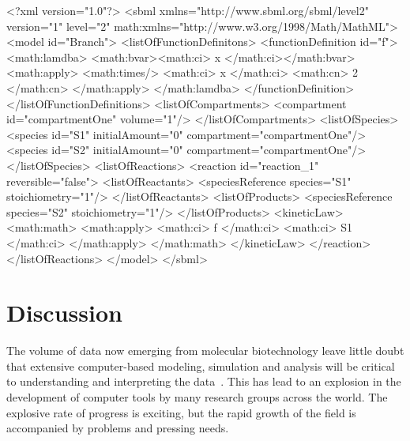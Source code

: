 \documentclass[10pt]{cekarticle}
\begin{document}
\begin{example}
<?xml version="1.0"?>
<sbml xmlns="http://www.sbml.org/sbml/level2" version="1" level="2"
      math:xmlns="http://www.w3.org/1998/Math/MathML">
    <model id="Branch">
        <listOfFunctionDefinitons>
            <functionDefinition id="f">
                <math:lamdba>
                    <math:bvar><math:ci> x </math:ci></math:bvar>
                    <math:apply>
                        <math:times/>
                        <math:ci> x </math:ci>
                        <math:cn> 2 </math:cn>
                    </math:apply>
                </math:lamdba>
            </functionDefinition>
        </listOfFunctionDefinitions>
        <listOfCompartments>
            <compartment id="compartmentOne" volume="1"/>
        </listOfCompartments>
        <listOfSpecies>
            <species id="S1" initialAmount="0" compartment="compartmentOne"/>
            <species id="S2" initialAmount="0" compartment="compartmentOne"/>
        </listOfSpecies>
        <listOfReactions>
            <reaction id="reaction_1" reversible="false">
                <listOfReactants>
                    <speciesReference species="S1" stoichiometry="1"/>
                </listOfReactants>
                <listOfProducts>
                    <speciesReference species="S2" stoichiometry="1"/>
                </listOfProducts>
                <kineticLaw>
                    <math:math>
                        <math:apply>
                            <math:ci> f </math:ci>
                            <math:ci> S1 </math:ci>
                         </math:apply>
                    </math:math>
                </kineticLaw>
            </reaction>
        </listOfReactions>
    </model>
</sbml>
\end{example}

\section{Discussion}
\label{sec:discussion}

The volume of data now emerging from molecular biotechnology
leave little doubt that extensive computer-based modeling, simulation and
analysis will be critical to understanding and interpreting the
data~\citep{abbott:1999,gilman:2000,popel:1998,smaglik:2000}.  This
has lead to an explosion in the development of computer tools by many
research groups across the world.  The explosive rate of progress is
exciting, but the rapid growth of the field is accompanied by problems and
pressing needs.
\end{document}
